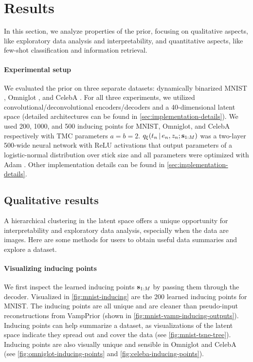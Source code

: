 \section{Results}
In this section, we 
analyze properties of the
\acronym\;prior,
focusing on
qualitative aspects, like exploratory data analysis and interpretability,
and quantitative aspects, like few-shot classification and information retrieval.
\paragraph{Experimental setup} We evaluated
the \acronym\;prior on three separate
datasets: dynamically binarized MNIST \citep{Lecun1998}, Omniglot \citep{Lake2015},
and CelebA \citep{Liu2015}. 
For all three experiments,
we utilized convolutional/deconvolutional encoders/decoders
and a 40-dimensional
latent space (detailed architectures can be found
in \autoref{sec:implementation-details}).
We used 200, 1000, and 500 inducing points for MNIST, Omniglot, and CelebA respectively 
with TMC parameters $a = b = 2$.
$q_{\xi}(t_n \,|\, e_n, z_n; \mathbf{s}_{1:M})$ was a
two-layer 500-wide neural network
with ReLU activations that output parameters of a
logistic-normal distribution over stick size
and all parameters were optimized with Adam \citep{Kingma2014adam}.
Other implementation details can be found in \autoref{sec:implementation-details}.

\subsection{Qualitative results}

A hierarchical clustering in the latent space
offers a unique opportunity for interpretability
and exploratory data analysis,
especially when the data are images.
Here are some methods for users to obtain
useful data summaries and explore a dataset.

\paragraph{Visualizing inducing points}
We first inspect the learned inducing points $\mathbf{s}_{1:M}$
by passing them through the decoder.
Visualized in \autoref{fig:mnist-inducing}
are the 200 learned inducing points for MNIST.
The inducing points are all unique
and are cleaner than pseudo-input reconstructions from VampPrior (shown in
\autoref{fig:mnist-vamp-inducing-outputs}).
Inducing points can help summarize a
dataset, as visualizations of the latent space
indicate they spread out and cover the data
(see \autoref{fig:mnist-tsne-tree}). Inducing points
are also visually unique and sensible
in Omniglot and CelebA (see
\autoref{fig:omniglot-inducing-points} and \ref{fig:celeba-inducing-points}).

